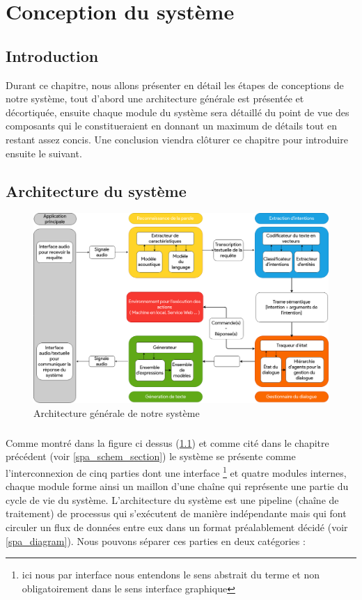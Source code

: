 \chapter{Conception du système}

\section{Introduction}
Durant ce chapitre, nous allons présenter en détail les étapes de conceptions de notre système, tout d'abord une architecture générale est présentée et décortiquée, ensuite chaque module du système sera détaillé du point de vue des composants qui le constitueraient en donnant un maximum de détails tout en restant assez concis. Une conclusion viendra clôturer ce chapitre pour introduire ensuite le suivant.
\section{Architecture du système}
\begin{figure}[H]
	\label{spa_arch}
	\centering
	\includegraphics[width=0.88\linewidth]{images/SPA_architecture.png}
	\caption{Architecture générale de notre système}
\end{figure}
\paragraph{}
Comme montré dans la figure ci dessus (\ref{spa_arch}) et comme cité dans le chapitre précédent (voir \ref{spa_schem_section}) le système se présente comme l'interconnexion de cinq parties dont une interface \footnote{ici nous par interface nous entendons le sens abstrait du terme et non obligatoirement  dans le sens interface graphique} et quatre modules internes, chaque module forme ainsi un maillon d'une chaîne qui représente une partie du cycle de vie du système. L'architecture du système est une pipeline (chaîne de traitement) de processus qui s'exécutent de manière indépendante mais qui font circuler un flux de données entre eux dans un format préalablement décidé (voir \ref{spa_diagram}). Nous pouvons séparer ces parties en deux catégories :
